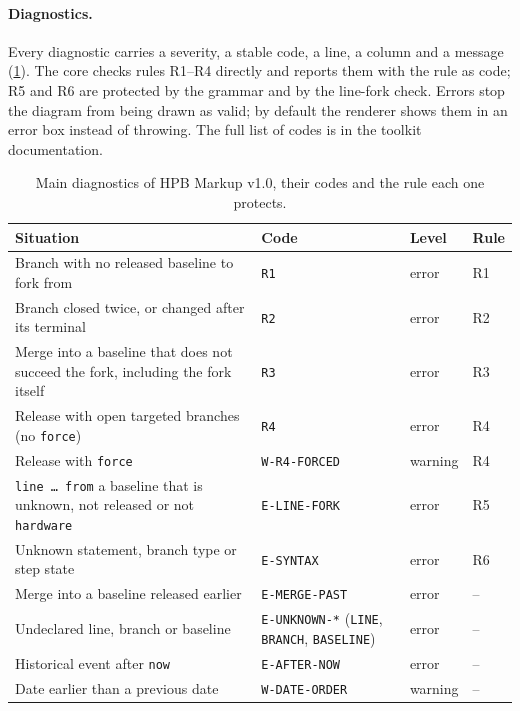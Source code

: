 \paragraph{Diagnostics.}
Every diagnostic carries a severity, a stable code, a line, a column and a
message (\cref{tab:markup-diag}). The core checks rules R1--R4 directly and
reports them with the rule as code; R5 and R6 are protected by the
grammar and by the line-fork check. Errors stop the diagram from being
drawn as valid; by default the renderer shows them in an error box instead
of throwing. The full list of codes is in the toolkit documentation.

\begin{table}[!htbp]
  \centering
  \small
  \caption{Main diagnostics of HPB Markup v1.0, their codes and the rule
    each one protects.}
  \label{tab:markup-diag}
  \renewcommand{\arraystretch}{1.1}
  \begin{tabularx}{\linewidth}{@{}>{\raggedright\arraybackslash}X
      >{\raggedright\arraybackslash}p{3.3cm}
      >{\centering\arraybackslash}p{1.1cm}
      >{\centering\arraybackslash}p{1.0cm}@{}}
    \toprule
    \textbf{Situation} & \textbf{Code} & \textbf{Level} & \textbf{Rule} \\
    \midrule
    Branch with no released baseline to fork from & \texttt{R1} & error & R1 \\
    Branch closed twice, or changed after its terminal & \texttt{R2} & error & R2 \\
    Merge into a baseline that does not succeed the fork, including the fork itself & \texttt{R3} & error & R3 \\
    Release with open targeted branches (no \texttt{force}) & \texttt{R4} & error & R4 \\
    Release with \texttt{force} & \texttt{W-R4-FORCED} & warning & R4 \\
    \texttt{line \dots{} from} a baseline that is unknown, not released or not \texttt{hardware} & \texttt{E-LINE-FORK} & error & R5 \\
    Unknown statement, branch type or step state & \texttt{E-SYNTAX} & error & R6 \\
    Merge into a baseline released earlier & \texttt{E-MERGE-PAST} & error & -- \\
    Undeclared line, branch or baseline & \texttt{E-UNKNOWN-*} (\texttt{LINE}, \texttt{BRANCH}, \texttt{BASELINE}) & error & -- \\
    Historical event after \texttt{now} & \texttt{E-AFTER-NOW} & error & -- \\
    Date earlier than a previous date & \texttt{W-DATE-ORDER} & warning & -- \\
    \bottomrule
  \end{tabularx}
\end{table}

